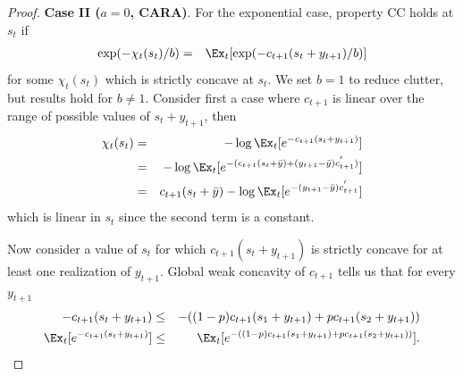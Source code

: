 \documentclass[titlepage]{\econtex}
\begin{document}
\begin{proof}
    \bigskip
    \noindent \textbf{Case II ($a = 0$, CARA)}. For the exponential case, property CC holds at $s_{t}$ if 
    \begin{eqnarray*}
      \exp(-\chi_{t}(s_{t})/b) & = & \Ex_{t}[ \exp(-c_{t+1}(s_{t}+{y}_{t+1})/b)]
    \end{eqnarray*}
    for some $\chi_{t}(s_{t})$ which is strictly concave at $s_{t}$. We set $b = 1$ to reduce clutter, but results hold for $b \neq 1$. Consider first a case where $c_{t+1}$ is linear over the range of possible values of $s_{t}+{y}_{t+1}$, then 
    \begin{eqnarray}
      \chi_{t}(s_{t}) & = & -\log \Ex_{t}[e^{-c_{t+1}(s_{t}+{y}_{t+1})}] \nonumber 
      \\& = & -\log \Ex_{t}[e^{-(c_{t+1}(s_{t}+\bar{y})+({y}_{t+1}-\bar{y})c_{t+1}^{'})}] \nonumber
      \\ & = & c_{t+1}(s_{t}+\bar{y}) - \log \Ex_{t}[e^{-({y}_{t+1}-\bar{y}) c_{t+1}^{'}}] \label{eq:expcdrops}
    \end{eqnarray}
    which is linear in $s_{t}$ since the second term is a constant.  
    
    Now consider a value of $s_{t}$ for which $c_{t+1}(s_{t}+{y}_{t+1})$ is strictly concave for at least one realization of ${y}_{t+1}$. Global weak concavity of $c_{t+1}$ tells us that for every ${y}_{t+1}$
    \begin{eqnarray}
      -c_{t+1}(s_{t}+{y}_{t+1}) & \leq & -((1-p)c_{t+1}(s_1+{y}_{t+1})+pc_{t+1}(s_{2}+{y}_{t+1})) \nonumber
      \\ \Ex_{t}[e^{-c_{t+1}(s_{t}+{y}_{t+1})}] & \leq & \Ex_{t}[e^{-((1-p)c_{t+1}(s_1+{y}_{t+1})+pc_{t+1}(s_{2}+{y}_{t+1}))}]. \label{eq:expconc}
    \end{eqnarray}
    

\end{proof}
\end{document}
